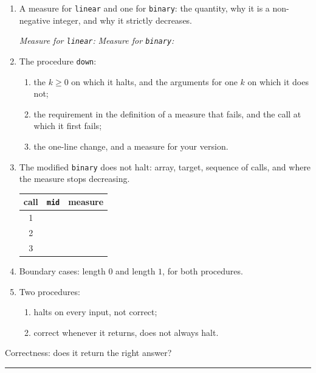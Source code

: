 \documentclass[11pt]{article}
\newcommand{\problem}[2]{%
  \vspace{4mm}
  \noindent{\large\bfseries Problem #1.} {\large #2}
  \par\vspace{1mm}\hrule\vspace{2mm}
}
\newenvironment{parts}{\begin{enumerate}[label=\textbf{(\alph*)}, leftmargin=*]}
                      {\end{enumerate}}
\begin{document}
\begin{parts}
  \item A measure for \texttt{linear} and one for \texttt{binary}: the quantity,
    why it is a non-negative integer, and why it strictly decreases.

    \emph{Measure for \texttt{linear}:} \qquad
    \emph{Measure for \texttt{binary}:}

  \item The procedure \texttt{down}:
    \begin{enumerate}[label=\textbf{(\roman*)}, leftmargin=*]
      \item the $k \geq 0$ on which it halts, and the arguments for one $k$ on
        which it does not;
      \item the requirement in the definition of a measure that fails, and the
        call at which it first fails;
      \item the one-line change, and a measure for your version.
    \end{enumerate}

  \item The modified \texttt{binary} does not halt: array, target, sequence of
    calls, and where the measure stops decreasing.
    \begin{center}
    \begin{tabular}{ccc}
      \toprule
      call & \texttt{mid} & measure \\
      \midrule
      1 & & \\
      2 & & \\
      3 & & \\
      \bottomrule
    \end{tabular}
    \end{center}

  \item Boundary cases: length $0$ and length $1$, for both procedures.

  \item Two procedures:
    \begin{enumerate}[label=\textbf{(\roman*)}, leftmargin=*]
      \item halts on every input, not correct;
      \item correct whenever it returns, does not always halt.
    \end{enumerate}
\end{parts}

\problem{3}{Correctness: does it return the right answer?}
\end{document}
